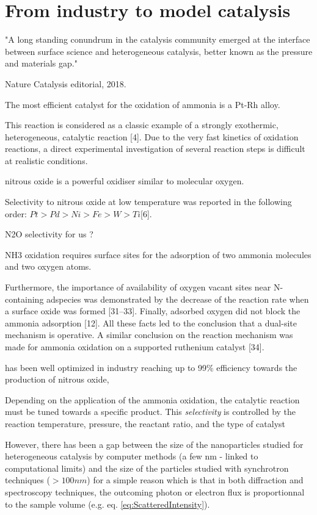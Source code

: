 \section{From industry to model catalysis}

"A long standing conundrum in the catalysis community emerged at the interface between surface science and heterogeneous catalysis, better known as the pressure and materials gap."

Nature Catalysis editorial, 2018.

The most efficient catalyst for the oxidation of ammonia is a Pt-Rh alloy.


This reaction is considered as a classic example of a strongly exothermic, heterogeneous, catalytic reaction [4].
Due to the very fast kinetics of oxidation reactions, a direct experimental investigation of several reaction steps is difficult at realistic conditions.

nitrous oxide is a powerful oxidiser similar to molecular oxygen.

Selectivity to nitrous oxide at low temperature was reported in the following order: $Pt > Pd > Ni > Fe > W > Ti $[6].

N2O selectivity for us ?

NH3 oxidation requires surface sites for the adsorption of two ammonia molecules and two oxygen atoms.

Furthermore, the importance of availability of oxygen vacant sites near N-containing adspecies was demonstrated by the decrease of the reaction rate when a surface oxide was formed [31–33].
Finally, adsorbed oxygen did not block the ammonia adsorption [12].
All these facts led to the conclusion that a dual-site mechanism is operative.
A similar conclusion on the reaction mechanism was made for ammonia oxidation on a supported ruthenium catalyst [34].

has been well optimized in industry reaching up to 99\% efficiency towards the production of nitrous oxide,

Depending on the application of the ammonia oxidation, the catalytic reaction must be tuned towards a specific product.
This \textit{selectivity} is controlled by the reaction temperature, pressure, the  reactant ratio, and the type of catalyst


However, there has been a gap between the size of the nanoparticles studied for heterogeneous catalysis by computer methods (a few nm - linked to computational limits) and the size of the particles studied with synchrotron techniques ($>100 nm$) for a simple reason which is that in both diffraction and spectroscopy techniques, the outcoming photon or electron flux is proportionnal to the sample volume (e.g. eq. \ref{eq:ScatteredIntensity}).

